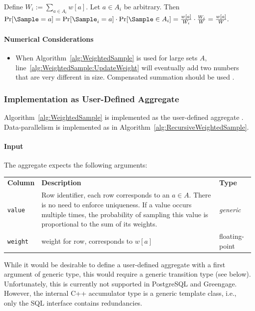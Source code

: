 Define $W_i := \sum_{a \in A_i} w[a]$. Let $a \in A_i$ be arbitrary. Then $\Pr[\Sample = a] = \Pr[\Sample_i = a] \cdot \Pr[\Sample \in A_i] = \frac{w[a]}{W_i} \cdot \frac{W_i}{W} = \frac{w[a]}{W}.$

\paragraph{Numerical Considerations}

\begin{itemize}
	\item When Algorithm~\ref{alg:WeightedSample} is used for large sets $A$, line~\ref{alg:WeightedSample:UpdateWeight} will eventually add two numbers that are very different in size. Compensated summation should be used \cite{ORO05a}.
\end{itemize}

\subsubsection{Implementation as User-Defined Aggregate}

Algorithm~\ref{alg:WeightedSample} is implemented as the user-defined aggregate . Data-parallelism is implemented as in Algorithm~\ref{alg:RecursiveWeightedSample}.

\paragraph{Input} The aggregate expects the following arguments:

\begin{center}
	\begin{tabularx}{\linewidth}{lXl}
		\toprule%
		\textbf{Column} & \textbf{Description} & \textbf{Type}
		\\\otoprule
		\texttt{value} &
		Row identifier, each row corresponds to an $a \in A$. There is no need to enforce uniqueness. If a value occurs multiple times, the probability of sampling this value is proportional to the sum of its weights. &
		\textit{generic}
		\\\midrule
		\texttt{weight} &
		weight for row, corresponds to $w[a]$ &
		floating-point
		\\\bottomrule
	\end{tabularx}
\end{center}
%
While it would be desirable to define a user-defined aggregate with a first argument of generic type, this would require a generic transition type (see below). Unfortunately, this is currently not supported in PostgreSQL and Greengage. However, the internal C++ accumulator type is a generic template class, i.e., only the SQL interface contains redundancies.

